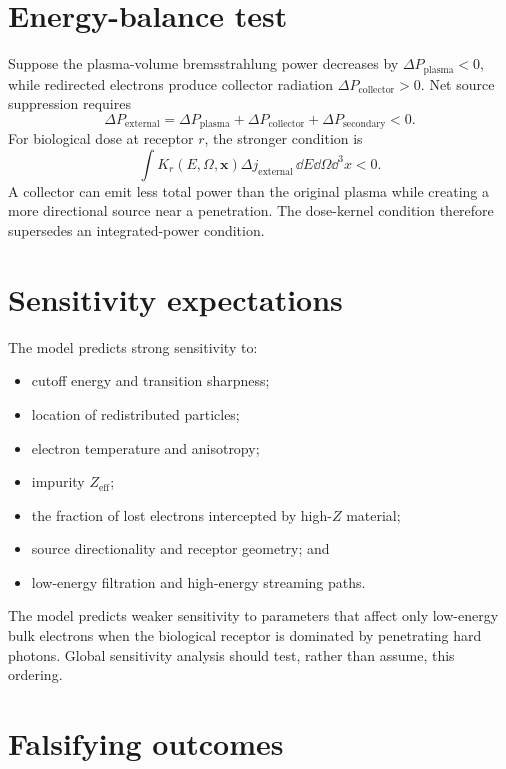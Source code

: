 \section{Energy-balance test}

Suppose the plasma-volume bremsstrahlung power decreases by $\Delta P_{\mathrm{plasma}}<0$, while redirected electrons produce collector radiation $\Delta P_{\mathrm{collector}}>0$. Net source suppression requires
\begin{equation}
\Delta P_{\mathrm{external}}
=\Delta P_{\mathrm{plasma}}
+\Delta P_{\mathrm{collector}}
+\Delta P_{\mathrm{secondary}}<0.
\end{equation}
For biological dose at receptor $r$, the stronger condition is
\begin{equation}
\int K_r(E,\Omega,\mathbf{x})\Delta j_{\mathrm{external}}\,
\dd E\dd\Omega\dd^3x<0.
\end{equation}
A collector can emit less total power than the original plasma while creating a more directional source near a penetration. The dose-kernel condition therefore supersedes an integrated-power condition.

\section{Sensitivity expectations}

The model predicts strong sensitivity to:
\begin{itemize}
\item cutoff energy and transition sharpness;
\item location of redistributed particles;
\item electron temperature and anisotropy;
\item impurity $Z_{\mathrm{eff}}$;
\item the fraction of lost electrons intercepted by high-$Z$ material;
\item source directionality and receptor geometry; and
\item low-energy filtration and high-energy streaming paths.
\end{itemize}
The model predicts weaker sensitivity to parameters that affect only low-energy bulk electrons when the biological receptor is dominated by penetrating hard photons. Global sensitivity analysis should test, rather than assume, this ordering.

\section{Falsifying outcomes}

